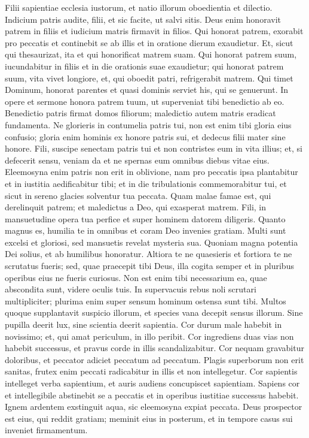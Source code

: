 \begin{biblechapter}  
\verse Filii sapientiae ecclesia iustorum, et natio illorum oboedientia et dilectio. 
\verse Indicium patris audite, filii, et sic facite, ut salvi sitis. 
\verse Deus enim honoravit patrem in filiis et iudicium matris firmavit in filios. 
\verse Qui honorat patrem, exorabit pro peccatis et continebit se ab illis et in oratione dierum exaudietur. 
\verse Et, sicut qui thesaurizat, ita et qui honorificat matrem suam. 
\verse Qui honorat patrem suum, iucundabitur in filiis et in die orationis suae exaudietur; 
\verse qui honorat patrem suum, vita vivet longiore, et, qui oboedit patri, refrigerabit matrem. 
\verse Qui timet Dominum, honorat parentes et quasi dominis serviet his, qui se genuerunt. 
\verse In opere et sermone honora patrem tuum, 
\verse ut superveniat tibi benedictio ab eo. 
\verse Benedictio patris firmat domos filiorum; maledictio autem matris eradicat fundamenta. 
\verse Ne glorieris in contumelia patris tui, non est enim tibi gloria eius confusio; 
\verse gloria enim hominis ex honore patris sui, et dedecus filii mater sine honore. 
\verse Fili, suscipe senectam patris tui et non contristes eum in vita illius; 
\verse et, si defecerit sensu, veniam da et ne spernas eum omnibus diebus vitae eius. Eleemosyna enim patris non erit in oblivione, 
\verse nam pro peccatis ipsa plantabitur 
\verse et in iustitia aedificabitur tibi; et in die tribulationis commemorabitur tui, et sicut in sereno glacies solventur tua peccata. 
\verse Quam malae famae est, qui derelinquit patrem; et maledictus a Deo, qui exasperat matrem. 
\verse Fili, in mansuetudine opera tua perfice et super hominem datorem diligeris. 
\verse Quanto magnus es, humilia te in omnibus et coram Deo invenies gratiam. Multi sunt excelsi et gloriosi, sed mansuetis revelat mysteria sua. 
\verse Quoniam magna potentia Dei solius, et ab humilibus honoratur. 
\verse Altiora te ne quaesieris et fortiora te ne scrutatus fueris; sed, quae praecepit tibi Deus, illa cogita semper et in pluribus operibus eius ne fueris curiosus. 
\verse Non est enim tibi necessarium ea, quae abscondita sunt, videre oculis tuis. 
\verse In supervacuis rebus noli scrutari multipliciter; 
\verse plurima enim super sensum hominum ostensa sunt tibi. 
\verse Multos quoque supplantavit suspicio illorum, et species vana decepit sensus illorum. Sine pupilla deerit lux, sine scientia deerit sapientia. 
\verse Cor durum male habebit in novissimo; et, qui amat periculum, in illo peribit. 
\verse Cor ingrediens duas vias non habebit successus, et pravus corde in illis scandalizabitur. 
\verse Cor nequam gravabitur doloribus, et peccator adiciet peccatum ad peccatum. 
\verse Plagis superborum non erit sanitas, frutex enim peccati radicabitur in illis et non intellegetur. 
\verse Cor sapientis intelleget verba sapientium, et auris audiens concupiscet sapientiam. 
\verse Sapiens cor et intellegibile abstinebit se a peccatis et in operibus iustitiae successus habebit. 
\verse Ignem ardentem exstinguit aqua, sic eleemosyna expiat peccata. 
\verse Deus prospector est eius, qui reddit gratiam; meminit eius in posterum, et in tempore casus sui inveniet firmamentum. 
\end{biblechapter}

